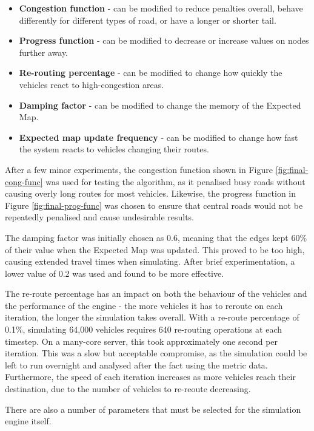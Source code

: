 \documentclass[ %
                    author={Alexander Hill},
                supervisor={Dr. Benjamin Sach},
                    degree={MEng},
                     title={MARMOSET},
                  subtitle={Multi-Agent Route Management using Online Simulation for Efficient Transportation},
                      type={research},
                      year={2016} ]{dissertation}
\begin{document}
\begin{itemize}
    \item \textbf{Congestion function} - can be modified to reduce penalties overall,
        behave differently for different types of road, or have a longer or shorter
        tail.
    \item \textbf{Progress function} - can be modified to decrease or increase
        values on nodes further away.
    \item \textbf{Re-routing percentage} - can be modified to change how quickly the
        vehicles react to high-congestion areas.
    \item \textbf{Damping factor} - can be modified to change the memory of
        the Expected Map.
    \item \textbf{Expected map update frequency} - can be modified to change how
        fast the system reacts to vehicles changing their routes.
\end{itemize}

After a few minor experiments, the congestion function shown in Figure
\ref{fig:final-cong-func} was used for testing the algorithm, as it penalised
busy roads without causing overly long routes for most vehicles. Likewise, the
progress function in Figure \ref{fig:final-prog-func} was chosen to ensure that
central roads would not be repeatedly penalised and cause undesirable results.

The damping factor was initially chosen as 0.6, meaning that the edges kept 60\%
of their value when the Expected Map was updated. This proved to be too high,
causing extended travel times when simulating. After brief experimentation, a
lower value of 0.2 was used and found to be more effective.

The re-route percentage has an impact on both the behaviour of the vehicles and
the performance of the engine - the more vehicles it has to reroute on each
iteration, the longer the simulation takes overall. With a re-route percentage
of 0.1\%, simulating 64,000 vehicles requires 640 re-routing operations at each
timestep. On a many-core server, this took approximately one second per
iteration. This was a slow but acceptable compromise, as the simulation could be
left to run overnight and analysed after the fact using the metric data.
Furthermore, the speed of each iteration increases as more vehicles reach their
destination, due to the number of vehicles to re-reoute decreasing.

There are also a number of parameters that must be selected for the simulation
engine itself.
\end{document}
